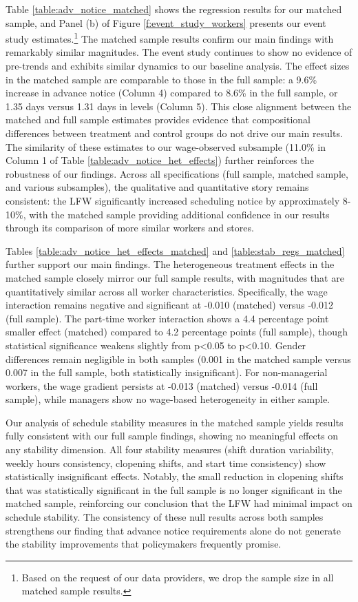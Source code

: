 \documentclass[letterpaper,11pt,leqno]{article}
\theoremstyle{paper}
\begin{document}
Table \ref{table:adv_notice_matched} shows the regression results for our matched sample, and Panel (b) of Figure \ref{f:event_study_workers} presents our event study estimates.\footnote{Based on the request of our data providers, we drop the sample size in all matched sample results.} The matched sample results confirm our main findings with remarkably similar magnitudes. The event study continues to show no evidence of pre-trends and exhibits similar dynamics to our baseline analysis. The effect sizes in the matched sample are comparable to those in the full sample: a 9.6\% increase in advance notice (Column 4) compared to 8.6\% in the full sample, or 1.35 days versus 1.31 days in levels (Column 5). This close alignment between the matched and full sample estimates provides evidence that compositional differences between treatment and control groups do not drive our main results. The similarity of these estimates to our wage-observed subsample (11.0\% in Column 1 of Table \ref{table:adv_notice_het_effects}) further reinforces the robustness of our findings. Across all specifications (full sample, matched sample, and various subsamples), the qualitative and quantitative story remains consistent: the LFW significantly increased scheduling notice by approximately 8-10\%, with the matched sample providing additional confidence in our results through its comparison of more similar workers and stores.

Tables \ref{table:adv_notice_het_effects_matched} and \ref{table:stab_regs_matched} further support our main findings. The heterogeneous treatment effects in the matched sample closely mirror our full sample results, with magnitudes that are quantitatively similar across all worker characteristics. Specifically, the wage interaction remains negative and significant at -0.010 (matched) versus -0.012 (full sample). The part-time worker interaction shows a 4.4 percentage point smaller effect (matched) compared to 4.2 percentage points (full sample), though statistical significance weakens slightly from p<0.05 to p<0.10. Gender differences remain negligible in both samples (0.001 in the matched sample versus 0.007 in the full sample, both statistically insignificant). For non-managerial workers, the wage gradient persists at -0.013 (matched) versus -0.014 (full sample), while managers show no wage-based heterogeneity in either sample. 

Our analysis of schedule stability measures in the matched sample yields results fully consistent with our full sample findings, showing no meaningful effects on any stability dimension. All four stability measures (shift duration variability, weekly hours consistency, clopening shifts, and start time consistency) show statistically insignificant effects. Notably, the small reduction in clopening shifts that was statistically significant in the full sample is no longer significant in the matched sample, reinforcing our conclusion that the LFW had minimal impact on schedule stability. The consistency of these null results across both samples strengthens our finding that advance notice requirements alone do not generate the stability improvements that policymakers frequently promise.
\end{document}
